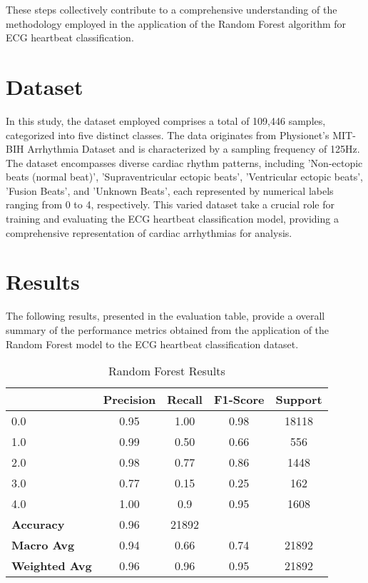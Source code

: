 \documentclass[conference]{IEEEtran}
\begin{document}
These steps collectively contribute to a comprehensive understanding of the methodology employed in the application of the Random Forest algorithm for ECG heartbeat classification.

\section{Dataset}
In this study, the dataset employed comprises a total of 109,446 samples, categorized into five distinct classes. The data originates from Physionet's MIT-BIH Arrhythmia Dataset and is characterized by a sampling frequency of 125Hz. The dataset encompasses diverse cardiac rhythm patterns, including 'Non-ectopic beats (normal beat)', 'Supraventricular ectopic beats', 'Ventricular ectopic beats', 'Fusion Beats', and 'Unknown Beats', each represented by numerical labels ranging from 0 to 4, respectively. This varied dataset take a crucial role for training and evaluating the ECG heartbeat classification model, providing a comprehensive representation of cardiac arrhythmias for analysis.

\section{Results}
The following results, presented in the evaluation table, provide a overall summary of the performance metrics obtained from the application of the Random Forest model to the ECG heartbeat classification dataset.

\begin{table}[H]
    \centering
    \begin{tabular}{lcccc}
        \toprule
        & Precision & Recall & F1-Score & Support \\
        \midrule
        0.0 & 0.95 & 1.00 & 0.98 & 18118 \\
        1.0 & 0.99 & 0.50 & 0.66 & 556 \\
        2.0 & 0.98 & 0.77 & 0.86 & 1448 \\
        3.0 & 0.77 & 0.15 & 0.25 & 162 \\
        4.0 & 1.00 & 0.9 & 0.95 & 1608 \\
        \midrule
        \textbf{Accuracy} & 0.96 & 21892 \\
        \textbf{Macro Avg} & 0.94 & 0.66 & 0.74 & 21892 \\
        \textbf{Weighted Avg} & 0.96 & 0.96 & 0.95 & 21892 \\
        \bottomrule
    \end{tabular}
    \caption{Random Forest Results}
    \label{tab:classification_results}
\end{table}
\end{document}
